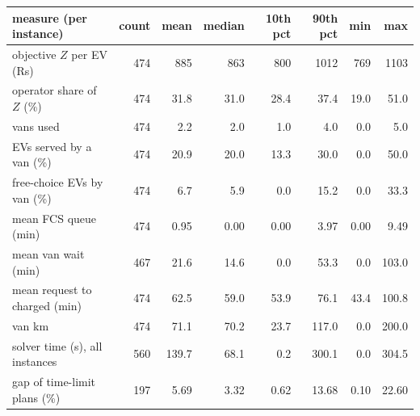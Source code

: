 \begin{tabular}{lrrrrrrr}\toprule
measure (per instance) & count & mean & median & 10th pct & 90th pct & min & max \\ \midrule
objective $Z$ per EV (Rs) & 474 & 885 & 863 & 800 & 1012 & 769 & 1103 \\
operator share of $Z$ (\%) & 474 & 31.8 & 31.0 & 28.4 & 37.4 & 19.0 & 51.0 \\
vans used & 474 & 2.2 & 2.0 & 1.0 & 4.0 & 0.0 & 5.0 \\
EVs served by a van (\%) & 474 & 20.9 & 20.0 & 13.3 & 30.0 & 0.0 & 50.0 \\
free-choice EVs by van (\%) & 474 & 6.7 & 5.9 & 0.0 & 15.2 & 0.0 & 33.3 \\
mean FCS queue (min) & 474 & 0.95 & 0.00 & 0.00 & 3.97 & 0.00 & 9.49 \\
mean van wait (min) & 467 & 21.6 & 14.6 & 0.0 & 53.3 & 0.0 & 103.0 \\
mean request to charged (min) & 474 & 62.5 & 59.0 & 53.9 & 76.1 & 43.4 & 100.8 \\
van km & 474 & 71.1 & 70.2 & 23.7 & 117.0 & 0.0 & 200.0 \\
solver time (s), all instances & 560 & 139.7 & 68.1 & 0.2 & 300.1 & 0.0 & 304.5 \\
gap of time-limit plans (\%) & 197 & 5.69 & 3.32 & 0.62 & 13.68 & 0.10 & 22.60 \\
\bottomrule\end{tabular}
